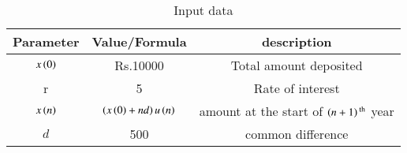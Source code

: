 \begin{table}[h]
\renewcommand\thetable{1}
    \centering
    \begin{tabular}{|c|c|c|}
        \hline
        \textbf{Parameter} & \textbf{Value/Formula} & \textbf{description}\\
        \hline
        $x\left(0\right)$ & Rs.10000 & Total amount deposited \\
        \hline
        r & 5 & Rate of interest\\
        \hline
        $x\left(n\right)$ & $\left(x\left(0\right) + nd\right)u\left(n\right)$ & amount at the start of $\left(n+1\right)\textsuperscript{th}$ year\\
        \hline
        $d$ & 500 & common difference \\
        \hline
    \end{tabular}
    \caption{Input data}
    \label{tab:Input data}
\end{table}
